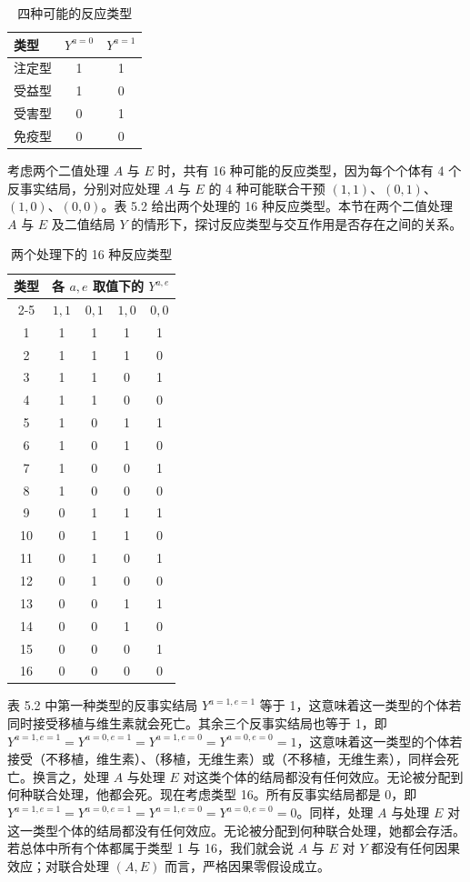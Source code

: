\begin{table}[htbp]
\centering
\caption{四种可能的反应类型}
\label{tab:5.1}
\small
\begin{tabular}{lcc}
\toprule
类型 & $Y^{a=0}$ & $Y^{a=1}$\\
\midrule
注定型 & 1 & 1\\
受益型 & 1 & 0\\
受害型 & 0 & 1\\
免疫型 & 0 & 0\\
\bottomrule
\end{tabular}
\end{table}

考虑两个二值处理 $A$ 与 $E$ 时，共有 16 种可能的反应类型，因为每个个体有 4 个反事实结局，分别对应处理 $A$ 与 $E$ 的 4 种可能联合干预 $(1,1)$、$(0,1)$、$(1,0)$、$(0,0)$。表 5.2 给出两个处理的 16 种反应类型。本节在两个二值处理 $A$ 与 $E$ 及二值结局 $Y$ 的情形下，探讨反应类型与交互作用是否存在之间的关系。

\begin{table}[htbp]
\centering
\caption{两个处理下的 16 种反应类型}
\label{tab:5.2}
\small
\renewcommand{\arraystretch}{0.98}
\begin{tabular}{ccccc}
\toprule
\multirow{2}{*}{类型} & \multicolumn{4}{c}{各 $a,e$ 取值下的 $Y^{a,e}$}\\
\cmidrule(lr){2-5}
& $1,1$ & $0,1$ & $1,0$ & $0,0$\\
\midrule
1  & 1 & 1 & 1 & 1\\
2  & 1 & 1 & 1 & 0\\
3  & 1 & 1 & 0 & 1\\
4  & 1 & 1 & 0 & 0\\
5  & 1 & 0 & 1 & 1\\
6  & 1 & 0 & 1 & 0\\
7  & 1 & 0 & 0 & 1\\
8  & 1 & 0 & 0 & 0\\
9  & 0 & 1 & 1 & 1\\
10 & 0 & 1 & 1 & 0\\
11 & 0 & 1 & 0 & 1\\
12 & 0 & 1 & 0 & 0\\
13 & 0 & 0 & 1 & 1\\
14 & 0 & 0 & 1 & 0\\
15 & 0 & 0 & 0 & 1\\
16 & 0 & 0 & 0 & 0\\
\bottomrule
\end{tabular}
\end{table}

表 5.2 中第一种类型的反事实结局 $Y^{a=1,e=1}$ 等于 1，这意味着这一类型的个体若同时接受移植与维生素就会死亡。其余三个反事实结局也等于 1，即 $Y^{a=1,e=1}=Y^{a=0,e=1}=Y^{a=1,e=0}=Y^{a=0,e=0}=1$，这意味着这一类型的个体若接受（不移植，维生素）、（移植，无维生素）或（不移植，无维生素），同样会死亡。换言之，处理 $A$ 与处理 $E$ 对这类个体的结局都没有任何效应。无论被分配到何种联合处理，他都会死。现在考虑类型 16。所有反事实结局都是 0，即 $Y^{a=1,e=1}=Y^{a=0,e=1}=Y^{a=1,e=0}=Y^{a=0,e=0}=0$。同样，处理 $A$ 与处理 $E$ 对这一类型个体的结局都没有任何效应。无论被分配到何种联合处理，她都会存活。若总体中所有个体都属于类型 1 与 16，我们就会说 $A$ 与 $E$ 对 $Y$ 都没有任何因果效应；对联合处理 $(A,E)$ 而言，严格因果零假设成立。

